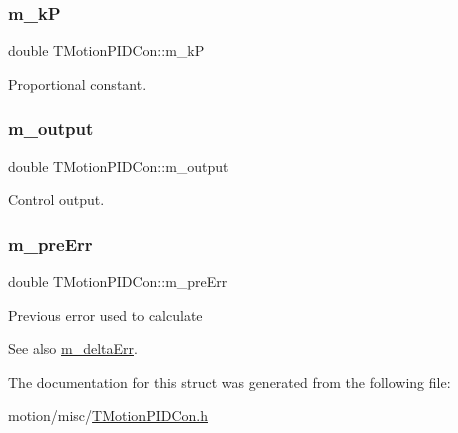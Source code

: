 \subsubsection{\texorpdfstring{m\+\_\+kP}{m\_kP}}
{\footnotesize\ttfamily double T\+Motion\+P\+I\+D\+Con\+::m\+\_\+kP}

Proportional constant. \mbox{\label{structTMotionPIDCon_a51de95c7d07b1bf075d5e5834671506a}} 
\subsubsection{\texorpdfstring{m\+\_\+output}{m\_output}}
{\footnotesize\ttfamily double T\+Motion\+P\+I\+D\+Con\+::m\+\_\+output}

Control output. \mbox{\label{structTMotionPIDCon_a319c2f863bb3965d8caaa008e2e1bd87}} 
\subsubsection{\texorpdfstring{m\+\_\+pre\+Err}{m\_preErr}}
{\footnotesize\ttfamily double T\+Motion\+P\+I\+D\+Con\+::m\+\_\+pre\+Err}

Previous error used to calculate \begin{DoxySeeAlso}{See also}
\mbox{\hyperlink{structTMotionPIDCon_a70da1dcf5bae866184f047980ef4eae2}{m\+\_\+delta\+Err}}. 
\end{DoxySeeAlso}


The documentation for this struct was generated from the following file\+:\begin{DoxyCompactItemize}
\item 
motion/misc/\mbox{\hyperlink{TMotionPIDCon_8h}{T\+Motion\+P\+I\+D\+Con.\+h}}\end{DoxyCompactItemize}
